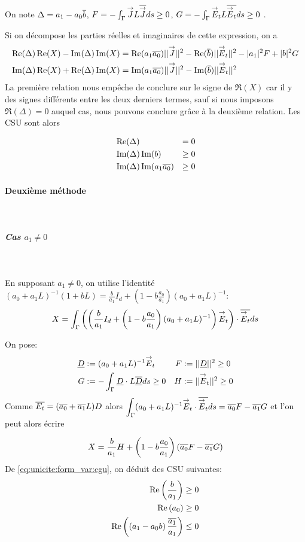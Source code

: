 On note $\Delta = a_1 -a_0{\overline{b}}$, $F = -\int_\Gamma {\overset{\rightarrow}{J}} L {\overline{{\overset{\rightarrow}{J}}}} ds \ge 0 $, $G = -\int_\Gamma {\overset{\rightarrow}{E}}_t L {\overline{{\overset{\rightarrow}{E}}_t}} ds \ge 0 $ . 

Si on décompose les parties réelles et imaginaires de cette expression, on a
\begin{align*}
\operatorname{Re}(\Delta)\operatorname{Re}(X) - \operatorname{Im}(\Delta)\operatorname{Im}(X) &= \operatorname{Re}(a_1{\overline{a_0}}) ||{\overset{\rightarrow}{J}}||^2 - \operatorname{Re}({\overline{b}})||{\overset{\rightarrow}{E}}_t||^2 -|a_1|^2 F + |b|^2 G \\
\operatorname{Im}(\Delta)\operatorname{Re}(X) + \operatorname{Re}(\Delta)\operatorname{Im}(X) &= \operatorname{Im}(a_1{\overline{a_0}}) ||{\overset{\rightarrow}{J}}||^2 - \operatorname{Im}({\overline{b}})||{\overset{\rightarrow}{E}}_t||^2
\end{align*}
La première relation nous empêche de conclure sur le signe de $\Re(X)$ car il y des signes différents entre les deux derniers termes, sauf si nous imposons $\Re( \Delta)= 0$ auquel cas, nous pouvons conclure grâce à la deuxième relation. Les CSU sont alors

\begin{align}
&\operatorname{Re}(\Delta) &= 0\\
&\operatorname{Im}(\Delta)\operatorname{Im}(b) &\ge 0\\
&\operatorname{Im}(\Delta)\operatorname{Im}(a_1{\overline{a_0}})&\ge 0
\end{align}

\paragraph{Deuxième méthode}
~
\subparagraph{Cas $a_1\not=0$}
~

En supposant $a_1 \not=0$, on utilise l'identité $(a_0 + a_1 L)^{-1}(1 + b L)  = \frac{b}{a_1} I_d + \left(1-b\frac{a_0}{a_1}\right)(a_0+a_1L)^{-1}$:
\[
X = \int_\Gamma \left(\left(\dfrac{b}{a_1} I_d + \left(1-b\dfrac{a_0}{a_1}\right)(a_0+a_1L)^{-1}\right){\overset{\rightarrow}{E}}_t\right) \cdot {\overline{{\overset{\rightarrow}{E}}_t}} ds
\]

On pose:
\begin{align*}
\underline{D} &:= (a_0 + a_1 L)^{-1}{\overset{\rightarrow}{E}}_t & F&:= || \underline{D} || ^2 \ge 0  \\
G&:= -\int_\Gamma \underline{D} \cdot L{\overline{\underline{D}}} ds \ge 0 & H &:= || {\overset{\rightarrow}{E}}_t || ^2 \ge 0
\end{align*}
Comme ${\overline{E_t}} = ({\overline{a_0}} + {\overline{a_1}}L)D$ alors $\displaystyle\int_\Gamma (a_0 +a_1 L) ^{-1}{\overset{\rightarrow}{E}}_t\cdot {\overline{{\overset{\rightarrow}{E}}_t}} ds = {\overline{a_0}} F - {\overline{a_1}} G$ et l'on peut alors écrire

\begin{equation}
\label{eq:unicite:form_var:decomp_cgu_ci1_a1}
X = \dfrac{b}{a_1}H   + \left(1-b\dfrac{a_0}{a_1}\right)\left({\overline{a_0}} F - {\overline{a_1}} G\right)
\end{equation}
De \eqref{eq:unicite:form_var:cgu}, on déduit des CSU suivantes:
\begin{align}
\operatorname{Re}\left(\dfrac{b}{a_1}\right) \ge 0 \\
\operatorname{Re}\left(a_0\right) \ge 0 \\
\operatorname{Re}\left(\left(a_1-a_0 b\right)\dfrac{{\overline{a_1}}}{a_1}\right) \le 0
\end{align}


